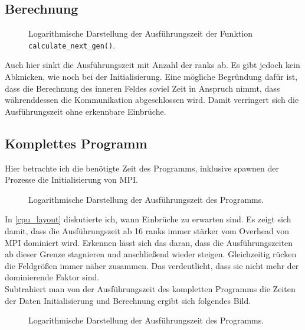 \documentclass[german,plainarticle,hyperref,utf8]{zihpub}
\begin{document}
	\subsection{Berechnung}
	\begin{figure}[h]
		\centering
		
		\caption{Logarithmische Darstellung der Ausführungszeit der Funktion \texttt{calculate\_next\_gen()}.}
	\end{figure}
	Auch hier sinkt die Ausführungszeit mit Anzahl der ranks ab. Es gibt jedoch kein Abknicken, wie noch bei der Initialisierung. Eine mögliche Begründung dafür ist, dass die Berechnung des inneren Feldes soviel Zeit in Anspruch nimmt, dass währenddessen die Kommunikation abgeschlossen wird. Damit verringert sich die Ausführungszeit ohne erkennbare Einbrüche.
	\subsection{Komplettes Programm}
	Hier betrachte ich die benötigte Zeit des Programms, inklusive spawnen der Prozesse die Initialisierung von MPI.
	\begin{figure}[h]
		\centering
		
		\caption{Logarithmische Darstellung der Ausführungszeit des Programms.}
	\end{figure}
	In \ref{cpu_layout} diskutierte ich, wann Einbrüche zu erwarten sind. Es zeigt sich damit, dass die Ausführungszeit ab 16 ranks immer stärker vom Overhead von MPI dominiert wird. Erkennen lässt sich das daran, dass die Ausführungszeiten ab dieser Grenze stagnieren und anschließend wieder steigen. Gleichzeitig rücken die Feldgrößen immer näher zusammen. Das verdeutlicht, dass sie nicht mehr der dominierende Faktor sind.\\
	
	Subtrahiert man von der Ausführungszeit des kompletten Programms die Zeiten der Daten Initialisierung und Berechnung ergibt sich folgendes Bild.
	\begin{figure}[h]
		\centering
		
		\caption{Logarithmische Darstellung der Ausführungszeit des Programms.}
	\end{figure}
	\newpage
	\appendix
\end{document}
